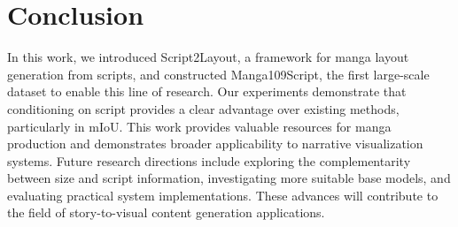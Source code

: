 \section{Conclusion}

In this work, we introduced Script2Layout, a framework for manga layout generation from scripts, and constructed Manga109Script, the first large-scale dataset to enable this line of research. Our experiments demonstrate that conditioning on script provides a clear advantage over existing methods, particularly in mIoU. This work provides valuable resources for manga production and demonstrates broader applicability to narrative visualization systems. Future research directions include exploring the complementarity between size and script information, investigating more suitable base models, and evaluating practical system implementations. These advances will contribute to the field of story-to-visual content generation applications.